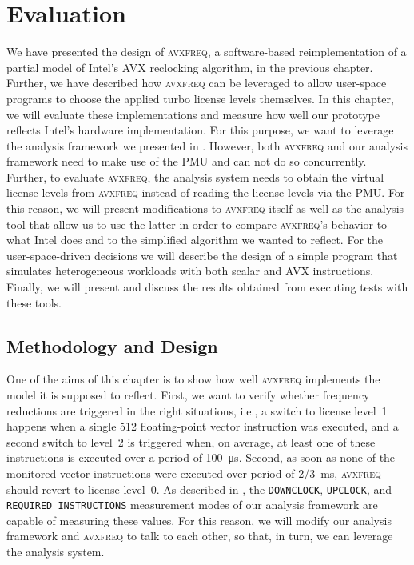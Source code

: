 \chapter{Evaluation}
\label{sec:evaluation}

We have presented the design of \textsc{avxfreq}, a software-based reimplementation of a partial model of Intel's \gls{AVX} reclocking algorithm, in the previous chapter. Further, we have described how \textsc{avxfreq} can be leveraged to allow user-space programs to choose the applied turbo license levels themselves. In this chapter, we will evaluate these implementations and measure how well our prototype reflects Intel's hardware implementation. For this purpose, we want to leverage the analysis framework we presented in . However, both \textsc{avxfreq} and our analysis framework need to make use of the \gls{PMU} and can not do so concurrently. Further, to evaluate \textsc{avxfreq}, the analysis system needs to obtain the virtual license levels from \textsc{avxfreq} instead of reading the license levels via the \gls{PMU}. For this reason, we will present modifications to \textsc{avxfreq} itself as well as the analysis tool that allow us to use the latter in order to compare \textsc{avxfreq}'s behavior to what Intel does and to the simplified algorithm we wanted to reflect. For the user-space-driven decisions we will describe the design of a simple program that simulates heterogeneous workloads with both scalar and \gls{AVX} instructions. Finally, we will present and discuss the results obtained from executing tests with these tools.

\section{Methodology and Design}
\label{sec:evaluation:methodology}

One of the aims of this chapter is to show how well \textsc{avxfreq} implements the model it is supposed to reflect. First, we want to verify whether frequency reductions are triggered in the right situations, i.e., a switch to license level~1 happens when a single \SI[number-unit-product=-]{512}{\bit} floating-point vector instruction was executed, and a second switch to level~2 is triggered when, on average, at least one of these instructions is executed over a period of \SI{100}{\micro\second}. Second, as soon as none of the monitored vector instructions were executed over period of \SI[quotient-mode=fraction]{2/3}{\milli\second}, \textsc{avxfreq} should revert to license level~0. As described in , the \texttt{DOWNCLOCK}, \texttt{UPCLOCK}, and \texttt{REQUIRED\_INSTRUCTIONS} measurement modes of our analysis framework are capable of measuring these values. For this reason, we will modify our analysis framework and \textsc{avxfreq} to talk to each other, so that, in turn, we can leverage the analysis system.


